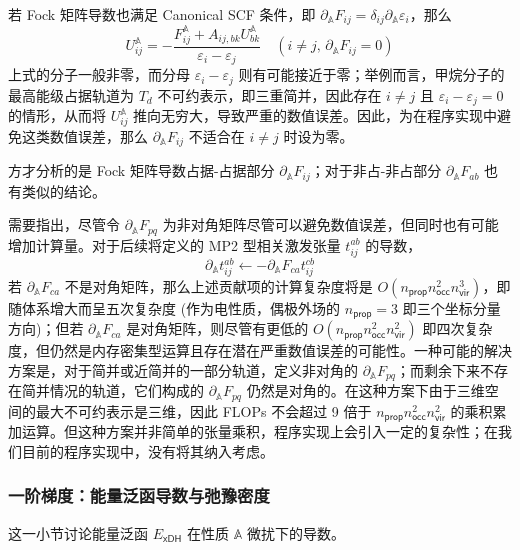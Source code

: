 若 Fock 矩阵导数也满足 Canonical SCF 条件，即 $\partial_\mathbb{A} F_{ij} = \delta_{ij} \partial_\mathbb{A} \varepsilon_i$，那么
\begin{equation}
  U_{ij}^\mathbb{A} = - \frac{F_{ij}^\mathbb{A} + A_{ij, bk} U_{bk}^\mathbb{A}}{\varepsilon_i - \varepsilon_j} \quad \left( i \neq j, \, \partial_\mathbb{A} F_{ij} = 0 \right)
\end{equation}
上式的分子一般非零，而分母 $\varepsilon_i - \varepsilon_j$ 则有可能接近于零；举例而言，甲烷分子的最高能级占据轨道为 $T_d$ 不可约表示，即三重简并，因此存在 $i \neq j$ 且 $\varepsilon_i - \varepsilon_j = 0$ 的情形，从而将 $U_{ij}^\mathbb{A}$ 推向无穷大，导致严重的数值误差。因此，为在程序实现中避免这类数值误差，那么 $\partial_\mathbb{A} F_{ij}$ 不适合在 $i \neq j$ 时设为零。

方才分析的是 Fock 矩阵导数占据-占据部分 $\partial_\mathbb{A} F_{ij}$；对于非占-非占部分 $\partial_\mathbb{A} F_{ab}$ 也有类似的结论。

需要指出，尽管令 $\partial_\mathbb{A} F_{pq}$ 为非对角矩阵尽管可以避免数值误差，但同时也有可能增加计算量。对于后续将定义的 MP2 型相关激发张量 $t_{ij}^{ab}$ 的导数，
\begin{equation*}
  \partial_\mathbb{A} t_{ij}^{ab} \leftarrow - \partial_\mathbb{A} F_{ca} t_{ij}^{cb}
\end{equation*}
若 $\partial_\mathbb{A} F_{ca}$ 不是对角矩阵，那么上述贡献项的计算复杂度将是 $O(n_\textsf{prop} n_\textsf{occ}^2 n_\textsf{vir}^3)$，即随体系增大而呈五次复杂度 (作为电性质，偶极外场的 $n_\textsf{prop} = 3$ 即三个坐标分量方向)；但若 $\partial_\mathbb{A} F_{ca}$ 是对角矩阵，则尽管有更低的 $O(n_\textsf{prop} n_\textsf{occ}^2 n_\textsf{vir}^2)$ 即四次复杂度，但仍然是内存密集型运算且存在潜在严重数值误差的可能性。一种可能的解决方案是，对于简并或近简并的一部分轨道，定义非对角的 $\partial_\mathbb{A} F_{pq}$；而剩余下来不存在简并情况的轨道，它们构成的 $\partial_\mathbb{A} F_{pq}$ 仍然是对角的。在这种方案下由于三维空间的最大不可约表示是三维，因此 FLOPs 不会超过 9 倍于 $n_\textsf{prop} n_\textsf{occ}^2 n_\textsf{vir}^2$ 的乘积累加运算\cite{Stoychev-Neese.JCTC.2018}。但这种方案并非简单的张量乘积，程序实现上会引入一定的复杂性；在我们目前的程序实现中，没有将其纳入考虑。

\subsubsection{一阶梯度：能量泛函导数与弛豫密度}

这一小节讨论能量泛函 $E_\textsf{xDH}$ 在性质 $\mathbb{A}$ 微扰下的导数。

